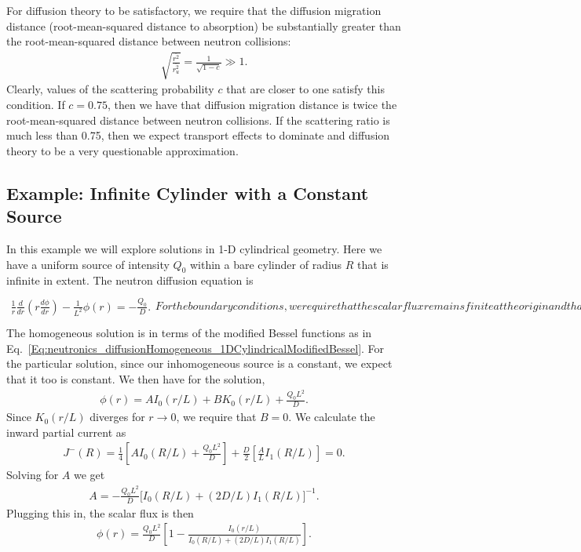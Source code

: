 For diffusion theory to be satisfactory, we require that the diffusion migration distance (root-mean-squared distance to absorption) be substantially greater than the root-mean-squared distance between neutron collisions:
\begin{align}
  \sqrt{ \frac{  \overline{r^2} }{  \overline{r_u^2} } } = \frac{1}{\sqrt{ 1 - c } } \gg 1.
\end{align}
Clearly, values of the scattering probability $c$ that are closer to one satisfy this condition. If $c = 0.75$, then we have that diffusion migration distance is twice the root-mean-squared distance between neutron collisions. If the scattering ratio is much less than 0.75, then we expect transport effects to dominate and diffusion theory to be a very questionable approximation.

\subsection{Example: Infinite Cylinder with a Constant Source}

In this example we will explore solutions in 1-D cylindrical geometry. Here we have a uniform source of intensity $Q_0$ within a bare cylinder of radius $R$ that is infinite in extent. The neutron diffusion equation is
\begin{subequations}
\begin{align}
  \frac{1}{r} \frac{d}{dr} \left( r \frac{d\phi}{dr} \right) - \frac{1}{L^2} \phi(r) = -\frac{Q_0}{D} .
\end{align}
For the boundary conditions, we require that the scalar flux remains finite at the origin and that there is no inward partial current at the end of the cylinder. This is
\begin{align}
  &\lim_{r \rightarrow 0} \phi(r) < 0, \\
  &J^-(R) = 0.
\end{align}
\end{subequations}
The homogeneous solution is in terms of the modified Bessel functions as in Eq.~\eqref{Eq:neutronics_diffusionHomogeneous_1DCylindricalModifiedBessel}. For the particular solution, since our inhomogeneous source is a constant, we expect that it too is constant. We then have for the solution,
\begin{align}
  \phi(r) = A I_0(r/L) + B K_0(r/L) + \frac{Q_0 L^2}{D} .
\end{align}
Since $K_0(r/L)$ diverges for $r \rightarrow 0$, we require that $B = 0$. We calculate the inward partial current as
\begin{align}
  J^-(R) = \frac{1}{4} \left[ A I_0(R/L) + \frac{Q_0 L^2}{D} \right] + \frac{D}{2} \left[ \frac{A}{L} I_1(R/L) \right] = 0.
\end{align}
Solving for $A$ we get
\begin{align}
  A = -\frac{Q_0 L^2}{D} \bigg[ I_0(R/L) + ( 2D / L ) I_1(R/L) \bigg]^{-1} .
\end{align}
Plugging this in, the scalar flux is then
\begin{align}
  \phi(r) = \frac{ Q_0 L^2 }{ D } \left[ 1 - \frac{ I_0(r/L) }{ I_0(R/L) + (2D/L) I_1(R/L) } \right] .
\end{align}

